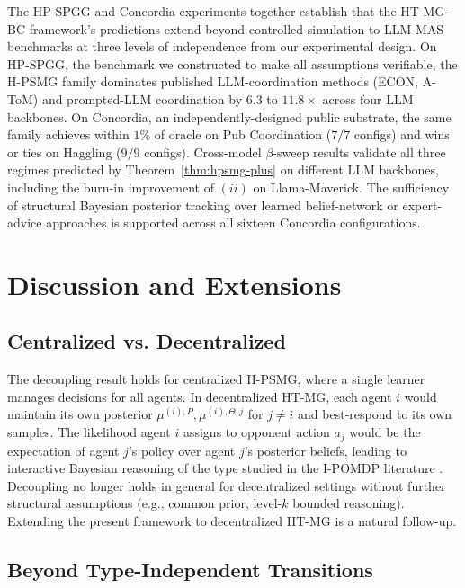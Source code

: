 \documentclass{article}
\begin{document}
The HP-SPGG and Concordia experiments together establish that the
HT-MG-BC framework's predictions extend beyond controlled simulation to LLM-MAS
benchmarks at three levels of independence from our experimental design. On
HP-SPGG, the benchmark we constructed to make all assumptions verifiable, the
H-PSMG family dominates published LLM-coordination methods (ECON, A-ToM) and
prompted-LLM coordination by $6.3$ to $11.8\times$ across four LLM backbones.
On Concordia, an independently-designed public substrate, the same family
achieves within $1\%$ of oracle on Pub Coordination ($7/7$ configs) and wins
or ties on Haggling ($9/9$ configs). Cross-model $\beta$-sweep results validate
all three regimes predicted by Theorem~\ref{thm:hpsmg-plus} on different LLM
backbones, including the burn-in improvement of $(ii)$ on Llama-Maverick. The
sufficiency of structural Bayesian posterior tracking over learned
belief-network or expert-advice approaches is supported across all sixteen
Concordia configurations.


\section{Discussion and Extensions}
\label{sec:discussion}

\subsection{Centralized vs. Decentralized}

The decoupling result holds for centralized H-PSMG, where a single learner manages decisions for all agents. In decentralized HT-MG, each agent $i$ would maintain its own posterior $\mu^{(i),P}, \mu^{(i),\Theta,j}$ for $j \neq i$ and best-respond to its own samples. The likelihood agent $i$ assigns to opponent action $a_j$ would be the expectation of agent $j$'s policy over agent $j$'s posterior beliefs, leading to interactive Bayesian reasoning of the type studied in the I-POMDP literature \citep{gmytrasiewicz2005framework}. Decoupling no longer holds in general for decentralized settings without further structural assumptions (e.g., common prior, level-$k$ bounded reasoning). Extending the present framework to decentralized HT-MG is a natural follow-up.

\subsection{Beyond Type-Independent Transitions}
\end{document}
